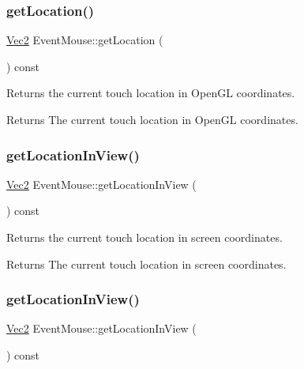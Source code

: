 \subsubsection{\texorpdfstring{get\+Location()}{getLocation()}\hspace{0.1cm}{\footnotesize\ttfamily [2/2]}}
{\footnotesize\ttfamily \hyperlink{classVec2}{Vec2} Event\+Mouse\+::get\+Location (\begin{DoxyParamCaption}{ }\end{DoxyParamCaption}) const}

Returns the current touch location in Open\+GL coordinates.

\begin{DoxyReturn}{Returns}
The current touch location in Open\+GL coordinates. 
\end{DoxyReturn}
\mbox{\label{classEventMouse_ae349cda326d1f48848a8b8f161fe66ed}} 
\subsubsection{\texorpdfstring{get\+Location\+In\+View()}{getLocationInView()}\hspace{0.1cm}{\footnotesize\ttfamily [1/2]}}
{\footnotesize\ttfamily \hyperlink{classVec2}{Vec2} Event\+Mouse\+::get\+Location\+In\+View (\begin{DoxyParamCaption}{ }\end{DoxyParamCaption}) const}

Returns the current touch location in screen coordinates.

\begin{DoxyReturn}{Returns}
The current touch location in screen coordinates. 
\end{DoxyReturn}
\mbox{\label{classEventMouse_ae349cda326d1f48848a8b8f161fe66ed}} 
\subsubsection{\texorpdfstring{get\+Location\+In\+View()}{getLocationInView()}\hspace{0.1cm}{\footnotesize\ttfamily [2/2]}}
{\footnotesize\ttfamily \hyperlink{classVec2}{Vec2} Event\+Mouse\+::get\+Location\+In\+View (\begin{DoxyParamCaption}{ }\end{DoxyParamCaption}) const}

